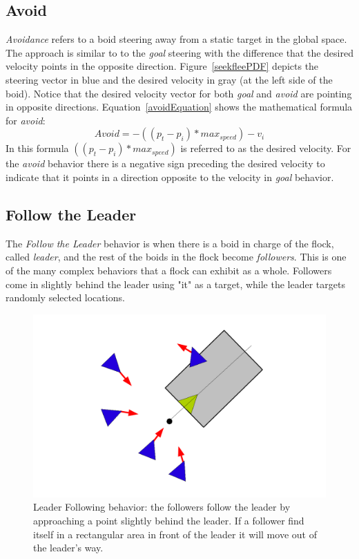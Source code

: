\subsection{Avoid}
\textit{Avoidance} refers to a boid steering away from a static target in the global space. The approach is similar to to the \textit{goal} steering with the difference that the desired velocity points in the opposite direction. Figure~\ref{seekfleePDF} depicts the steering vector in blue and the desired velocity in gray (at the left side of the boid). Notice that the desired velocity vector for both \textit{goal} and \textit{avoid} are pointing in opposite directions. Equation~\ref{avoidEquation} shows the mathematical formula for \textit{avoid}:
%
\begin{equation}
\label{avoidEquation}
Avoid = -((p_t - p_i) * max_{speed}) - v_i
\end{equation}
%
In this formula $((p_t - p_i) * max_{speed})$ is referred to as the desired velocity. 
For the \textit{avoid} behavior there is a negative sign preceding the desired velocity 
to indicate that it points in a direction opposite to the velocity in  \textit{goal} behavior.


\subsection{Follow the Leader}
The \textit{Follow the Leader} behavior is when there is a boid in charge of the flock, called \textit{leader}, and the rest of the boids in the flock become \textit{followers}.
 This is one of the many complex behaviors that a flock can exhibit as a whole. Followers come in slightly behind the leader using "it" as a target, while the leader targets randomly selected locations.

\begin{figure}[htbp]
\begin{center}
\includegraphics[scale=0.5]{figures/leaderFollowing.pdf}
\caption{Leader Following behavior: the followers follow the leader by approaching a point slightly behind the leader. If a follower find itself in a rectangular area in front of the leader it will move out of the leader's way.}
\label{leaderPDF}
\end{center}
\end{figure}

